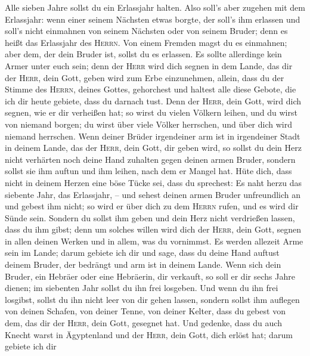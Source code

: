  Alle sieben Jahre sollst du ein Erlassjahr halten.
 Also soll's aber zugehen mit dem Erlassjahr: wenn einer
seinem Nächsten etwas borgte, der soll's ihm erlassen und soll's nicht
einmahnen von seinem Nächsten oder von seinem Bruder; denn es heißt das
Erlassjahr des \textsc{Herrn}.  Von einem Fremden magst du
es einmahnen; aber dem, der dein Bruder ist, sollst du es erlassen.
 Es sollte allerdinge kein Armer unter euch sein; denn der
\textsc{Herr} wird dich segnen in dem Lande, das dir der \textsc{Herr},
dein Gott, geben wird zum Erbe einzunehmen,  allein, dass
du der Stimme des \textsc{Herrn}, deines Gottes, gehorchest und haltest
alle diese Gebote, die ich dir heute gebiete, dass du darnach tust.
 Denn der \textsc{Herr}, dein Gott, wird dich segnen, wie
er dir verheißen hat; so wirst du vielen Völkern leihen, und du wirst
von niemand borgen; du wirst über viele Völker herrschen, und über dich
wird niemand herrschen.  Wenn deiner Brüder irgendeiner
arm ist in irgendeiner Stadt in deinem Lande, das der \textsc{Herr},
dein Gott, dir geben wird, so sollst du dein Herz nicht verhärten noch
deine Hand zuhalten gegen deinen armen Bruder,  sondern
sollst sie ihm auftun und ihm leihen, nach dem er Mangel hat.
 Hüte dich, dass nicht in deinem Herzen eine böse Tücke
sei, dass du sprechest: Es naht herzu das siebente Jahr, das Erlassjahr,
-- und sehest deinen armen Bruder unfreundlich an und gebest ihm nicht;
so wird er über dich zu dem \textsc{Herrn} rufen, und es wird dir Sünde
sein.  Sondern du sollst ihm geben und dein Herz nicht
verdrießen lassen, dass du ihm gibst; denn um solches willen wird dich
der \textsc{Herr}, dein Gott, segnen in allen deinen Werken und in
allem, was du vornimmst.  Es werden allezeit Arme sein im
Lande; darum gebiete ich dir und sage, dass du deine Hand auftust deinem
Bruder, der bedrängt und arm ist in deinem Lande.  Wenn
sich dein Bruder, ein Hebräer oder eine Hebräerin, dir verkauft, so soll
er dir sechs Jahre dienen; im siebenten Jahr sollst du ihn frei
losgeben.  Und wenn du ihn frei losgibst, sollst du ihn
nicht leer von dir gehen lassen,  sondern sollst ihm
auflegen von deinen Schafen, von deiner Tenne, von deiner Kelter, dass
du gebest von dem, das dir der \textsc{Herr}, dein Gott, gesegnet hat.
 Und gedenke, dass du auch Knecht warst in Ägyptenland
und der \textsc{Herr}, dein Gott, dich erlöst hat; darum gebiete ich dir
